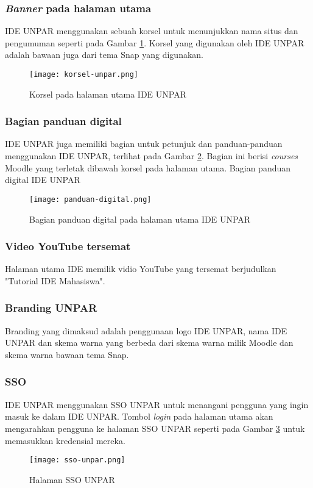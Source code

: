 \subsubsection {\textit{Banner} pada halaman utama}
IDE UNPAR menggunakan sebuah korsel untuk menunjukkan nama situs dan pengumuman seperti pada Gambar \ref{fig:korsel-unpar}. Korsel yang digunakan oleh IDE UNPAR adalah bawaan juga dari tema Snap yang digunakan.
\begin{figure}[H] 
	\centering  
	\texttt{[image: korsel-unpar.png]}  
	\caption[Korsel pada halaman utama] {Korsel pada halaman utama IDE UNPAR} 
	\label{fig:korsel-unpar} 
\end{figure}
\subsubsection {Bagian panduan digital}
IDE UNPAR juga memiliki bagian untuk petunjuk dan panduan-panduan menggunakan IDE UNPAR, terlihat pada Gambar \ref{fig:panduan-digital}. Bagian ini berisi \textit{courses} Moodle yang terletak dibawah korsel pada halaman utama. Bagian panduan digital IDE UNPAR 
\begin{figure}[H] 
	\centering  
	\texttt{[image: panduan-digital.png]}  
	\caption[Bagian panduan digital] {Bagian panduan digital pada halaman utama IDE UNPAR} 
	\label{fig:panduan-digital} 
\end{figure} 
\subsubsection {Video YouTube tersemat}
Halaman utama IDE memilik vidio YouTube yang tersemat berjudulkan "Tutorial IDE Mahasiswa".
\subsubsection {Branding UNPAR}
Branding yang dimaksud adalah penggunaan logo IDE UNPAR, nama IDE UNPAR dan skema warna yang berbeda dari skema warna milik Moodle dan skema warna bawaan tema Snap.
\subsubsection {SSO}
IDE UNPAR menggunakan SSO UNPAR untuk menangani pengguna yang ingin masuk ke dalam IDE UNPAR. Tombol \textit{login} pada halaman utama akan mengarahkan pengguna ke halaman SSO UNPAR seperti pada Gambar \ref{fig:sso-unpar} untuk memasukkan kredensial mereka.
\begin{figure}[H] 
	\centering  
	\texttt{[image: sso-unpar.png]}  
	\caption[Halaman SSO UNPAR] {Halaman SSO UNPAR} 
	\label{fig:sso-unpar} 
\end{figure} 

